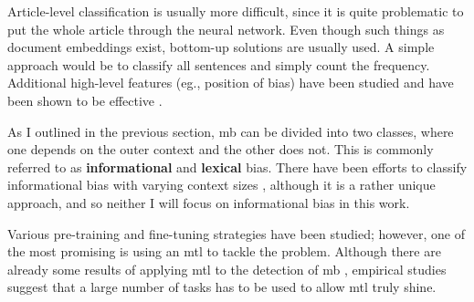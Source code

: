 Article-level classification is usually more difficult, since it is quite problematic to put the whole article through the neural network. Even though such things as document embeddings exist, bottom-up solutions are usually used. A simple approach would be to classify all sentences and simply count the frequency. Additional high-level features (eg., position of bias) have been studied and have been shown to be effective \cite{chen2020detecting,chen-etal-2020-analyzing}.

As I outlined in the previous section, \gls{mb} can be divided into two classes, where one depends on the outer context and the other does not. This is commonly referred to as \textbf{informational} and \textbf{lexical} bias. There have been efforts to classify informational bias with varying context sizes \cite{van2020context}, although it is a rather unique approach, and so neither I will focus on informational bias in this work.

Various pre-training and fine-tuning strategies have been studied; however, one of the most promising is using an \Gls{mtl} to tackle the problem. Although there are already some results of applying \Gls{mtl} to the detection of \gls{mb} \cite{lee2021unifying,spindeexploiting}, empirical studies suggest that a large number of tasks has to be used to allow \Gls{mtl} truly shine.